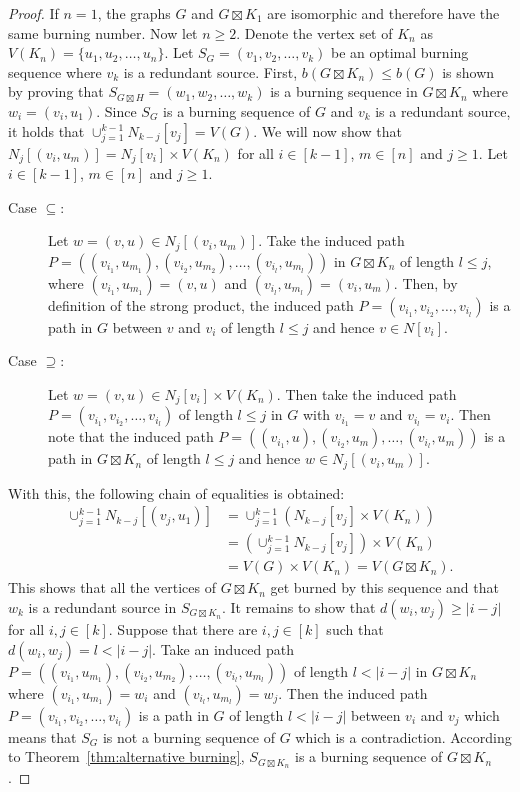 \documentclass[12pt]{article}
\theoremstyle{plain}
\theoremstyle{definition}
\theoremstyle{remark}
\begin{document}
\begin{proof} 
    If $n=1$, the graphs $G$ and $G\boxtimes K_1$ are isomorphic and therefore have the same burning number. Now let $n\geq 2$.
    Denote the vertex set of $K_n$ as $V(K_n) = \{u_1,u_2,\dots, u_n\}$.
    Let $S_G=(v_1,v_2,\dots,v_k)$ be an optimal burning sequence where $v_k$ is a redundant source.
    First, $b(G\boxtimes K_n)\leq b(G)$ is shown by proving that $S_{G\boxtimes H}=(w_1,w_2,\dots, w_k)$ is a burning sequence in $G\boxtimes K_n$ where $w_i=(v_i,u_1)$. 
    Since $S_G$ is a burning sequence of $G$ and $v_k$ is a redundant source, it holds that $\cup_{j=1}^{k-1}N_{k-j}[v_j]=V(G)$.
    We will now show that $N_j[(v_i,u_{m})] = N_j[v_i]\times V(K_n)$ for all $i\in [k-1]$, $m\in [n]$ and $j\geq 1$. Let $i\in [k-1]$, $m\in [n]$ and $j\geq 1$. 
    \begin{description}
        \item[Case $\subseteq$:] Let $w=(v,u)\in N_j[(v_i,u_m)]$. Take the induced path \linebreak $P=((v_{i_1},u_{m_1}),(v_{i_2},u_{m_2}),\dots,(v_{i_l},u_{m_l}))$
        in $G\boxtimes K_n$ of length $l\leq j$, where \linebreak $(v_{i_1},u_{m_1})=(v,u)$ and $(v_{i_l},u_{m_l})=(v_i,u_m)$. 
        Then, by definition of the strong product, the induced path $P=(v_{i_1},v_{i_2},\dots,v_{i_l})$
        is a path in $G$ between $v$ and $v_i$ of length $l\leq j$ and hence $v\in N[v_i]$.
        \item[Case $\supseteq$:] Let $w=(v,u)\in N_j[v_i]\times V(K_n)$. Then take the induced path \linebreak $P=(v_{i_1},v_{i_2},\dots,v_{i_l})$
        of length $l\leq j$ in $G$ with $v_{i_1}=v$ and $v_{i_l}=v_i$. Then note that the induced path $P=((v_{i_1},u),(v_{i_2},u_m),\dots,(v_{i_l},u_m))$
        is a path in $G\boxtimes K_n$ of length $l\leq j$ and hence $w\in N_j[(v_i,u_m)]$. 
    \end{description}
    With this, the following chain of equalities is obtained:
    \begin{align*}
        \cup_{j=1}^{k-1}N_{k-j}[(v_j,u_{1})] &= \cup_{j=1}^{k-1}\left( N_{k-j}[v_j]\times V(K_n) \right)\\
        &= \left( \cup_{j=1}^{k-1}N_{k-j}[v_j] \right) \times V(K_n) \\
        &= V(G) \times V(K_n) = V(G\boxtimes K_n).
    \end{align*}
    This shows that all the vertices of $G\boxtimes K_n$ get burned by this sequence and that $w_k$ is a redundant source in $S_{G\boxtimes K_n}$. It remains to show that $d(w_i,w_j)\geq |i-j|$ for all $i,j\in [k]$. Suppose that there are $i,j\in [k]$ such that $d(w_i,w_j)=l< |i-j|$. 
    Take an induced path $P=((v_{i_1},u_{m_1}),(v_{i_2},u_{m_2}),\dots,(v_{i_l},u_{m_l}))$
    of length $l < |i-j|$ in $G\boxtimes K_n$ where $(v_{i_1},u_{m_1})=w_i$ and $(v_{i_l},u_{m_l})=w_j$. 
    Then the induced path $P=(v_{i_1},v_{i_2},\dots,v_{i_l})$ is a path in $G$ of length $l < |i-j|$ between $v_i$ and $v_j$ which means that $S_G$ is not a burning sequence of $G$ which is a contradiction.
    According to Theorem~\ref{thm:alternative burning}, $S_{G\boxtimes K_n}$ is a burning sequence of $G\boxtimes K_n$. 
    

\end{proof}
\end{document}
